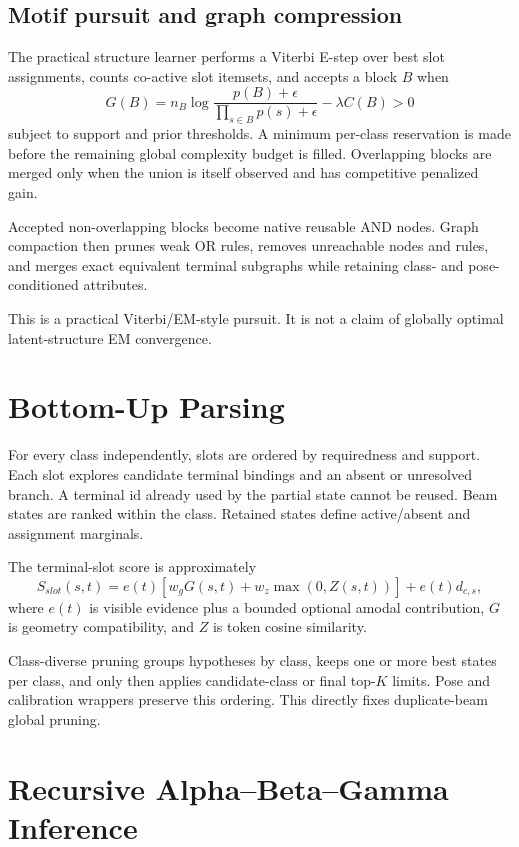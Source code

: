 \documentclass[11pt]{article}
\begin{document}
\subsection{Motif pursuit and graph compression}

The practical structure learner performs a Viterbi E-step over best slot
assignments, counts co-active slot itemsets, and accepts a block $B$ when
\[
G(B)=n_B\log\frac{p(B)+\epsilon}
{\prod_{s\in B}p(s)+\epsilon}-\lambda C(B)>0
\]
subject to support and prior thresholds. A minimum per-class reservation is made
before the remaining global complexity budget is filled. Overlapping blocks are
merged only when the union is itself observed and has competitive penalized gain.

Accepted non-overlapping blocks become native reusable AND nodes. Graph
compaction then prunes weak OR rules, removes unreachable nodes and rules, and
merges exact equivalent terminal subgraphs while retaining class- and
pose-conditioned attributes.

This is a practical Viterbi/EM-style pursuit. It is not a claim of globally
optimal latent-structure EM convergence.

\section{Bottom-Up Parsing}

For every class independently, slots are ordered by requiredness and support.
Each slot explores candidate terminal bindings and an absent or unresolved branch.
A terminal id already used by the partial state cannot be reused. Beam states are
ranked within the class. Retained states define active/absent and assignment
marginals.

The terminal-slot score is approximately
\[
S_{slot}(s,t)=e(t)\left[w_gG(s,t)+w_z\max(0,Z(s,t))\right]
+e(t)d_{c,s},
\]
where $e(t)$ is visible evidence plus a bounded optional amodal contribution,
$G$ is geometry compatibility, and $Z$ is token cosine similarity.

Class-diverse pruning groups hypotheses by class, keeps one or more best states per
class, and only then applies candidate-class or final top-$K$ limits. Pose and
calibration wrappers preserve this ordering. This directly fixes duplicate-beam
global pruning.

\section{Recursive Alpha--Beta--Gamma Inference}
\end{document}
